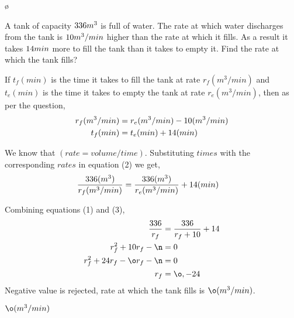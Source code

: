 

\DIVIDE{\vc}\vb\m
\MULTIPLY\m\va\n
\SUBTRACT\vd\va\o

\question[4] A tank of capacity $336 m^3$ is full of water. The rate at which water 
discharges from the tank is $10 m^3/min$ higher than the rate at which it fills. As a 
result it takes $14 min$ more to fill the tank than it takes to empty it. Find the 
rate at which the tank fills?

\begin{solution}[\halfpage]
  If $t_f(min)$ is the time it takes to fill the tank at rate $r_f(m^3/min)$ and $t_e(min)$ is the time it takes to empty the tank at rate $r_e(m^3/min)$, then as per the question,
  \begin{align}
    r_f(m^3/min) &= r_e(m^3/min) - 10(m^3/min) \\
    t_f(min)     &= t_e(min) + 14(min)
  \end{align}
  
  We know that $(rate=volume/time)$. Substituting $times$ with the corresponding 
  $rates$ in equation (2) we get,
  \begin{align}
    \dfrac{336(m^3)}{r_f(m^3/min)} &= 
      \dfrac{336(m^3)}{r_e(m^3/min)} + 14(min) 
  \end{align}
  
  Combining equations (1) and (3),
  \begin{align}      
    \dfrac{\vc}{r_f}              &= \dfrac{\vc}{r_f + \va} + \vb \\
    r_f^2 + \va r_f - \n          &= 0 \\
    r_f^2 + \vd r_f - \o r_f - \n &= 0 \\
    r_f                           &= \o, -\vd
  \end{align}
  Negative value is rejected, rate at which the tank fills is $\o(m^3/min)$.
\end{solution}



\ifprintanswers\begin{codex}$\o(m^3/min)$\end{codex}\fi

